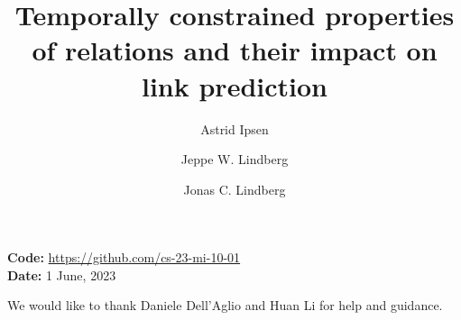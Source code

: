 \documentclass[sigconf,screen,nonacm=true]{acm_files/acmart}
\begin{document}
\fancyfoot[C]{\thepage/\pageref*{TotPages}}
\title{Temporally constrained properties of relations and their impact on link prediction}
\renewcommand{\footskip}{16mm}

\author{Astrid Ipsen}

\author{Jeppe W. Lindberg}

\author{Jonas C. Lindberg}

\begin{abstract}
\missing
\end{abstract}

%

\maketitle


\textbf{Code:} \url{https://github.com/cs-23-mi-10-01}
\\
\textbf{Date:} 1 June, 2023
















\begin{acks}
    We would like to thank Daniele Dell'Aglio and Huan Li for help and guidance.
\end{acks}




\pagebreak
\appendix



\end{document}
